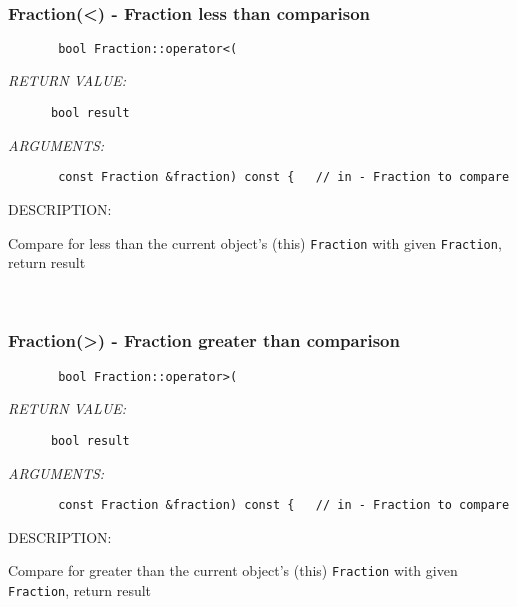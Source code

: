 \mbox{}\hrulefill\ 
 
\subsubsection [Fraction(<)] {Fraction(<) - Fraction less than comparison}


  
\begin{verbatim}       bool Fraction::operator<(\end{verbatim}{\em RETURN VALUE:}
\begin{verbatim}      bool result\end{verbatim}{\em ARGUMENTS:}
\begin{verbatim}       const Fraction &fraction) const {   // in - Fraction to compare\end{verbatim}
{\sf DESCRIPTION:\\ }


        Compare for less than the current object's (this)
        {\tt Fraction} with given {\tt Fraction}, return result
   
 
\mbox{}\hrulefill\ 
 
\subsubsection [Fraction(>)] {Fraction(>) - Fraction greater than comparison}


  
\begin{verbatim}       bool Fraction::operator>(\end{verbatim}{\em RETURN VALUE:}
\begin{verbatim}      bool result\end{verbatim}{\em ARGUMENTS:}
\begin{verbatim}       const Fraction &fraction) const {   // in - Fraction to compare\end{verbatim}
{\sf DESCRIPTION:\\ }


        Compare for greater than the current object's (this)
        {\tt Fraction} with given {\tt Fraction}, return result
   
 
\mbox{}\hrulefill\ 
 
